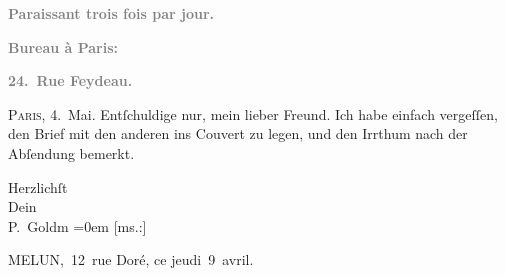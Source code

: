 \pstart
           \begin{otherlanguage}{french}\textcolor{gray}{\textbf{\textbf{Paraissant trois fois par jour.}}}\end{otherlanguage}\pend
           
\pstart
           \begin{otherlanguage}{french}\textcolor{gray}{\textbf{\textbf{Bureau à Paris:}}}\end{otherlanguage}\pend
           
\pstart
           \begin{otherlanguage}{french}\textcolor{gray}{\textbf{\textbf{24. Rue Feydeau.}}}\end{otherlanguage}\hfill \textsc{Paris}, 4. Mai.\pend
           \vspace{0.5em}
\pstart
           {\pb}Entſchuldige nur, mein lieber
                  Freund. Ich habe einfach vergeſſen, den Brief mit den anderen ins Couvert
               zu legen, und den Irrthum \label{K_L02773-1v}\label{K_L02773-1} nach der Abſendung bemerkt.\pend
           
\pstart
           Herzlichſt {\\[\baselineskip]}Dein {\\[\baselineskip]}\spacefill\mbox{P. Goldm}\pend
           \leftskip=0em{}\vspace{1em}{\vspace{1\baselineskip}}
\pstart
           {\pb}{[}ms.:{]} \begin{otherlanguage}{french}MELUN, 12 rue Doré, ce jeudi 9 avril.\end{otherlanguage}\pend
           
